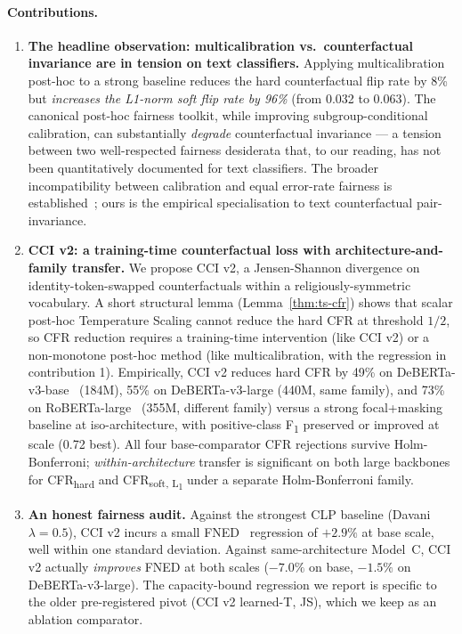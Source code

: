 \documentclass[10pt,a4paper]{article}
\begin{document}
\paragraph{Contributions.}
\begin{enumerate}[leftmargin=*,itemsep=2pt]
    \item \textbf{The headline observation: multicalibration vs.\ counterfactual invariance are in tension on text classifiers.} Applying multicalibration~\citep{hebertjohnson2018multicalibration} post-hoc to a strong baseline reduces the hard counterfactual flip rate by 8\% but \emph{increases the L1-norm soft flip rate by 96\%} (from 0.032 to 0.063). The canonical post-hoc fairness toolkit, while improving subgroup-conditional calibration, can substantially \emph{degrade} counterfactual invariance --- a tension between two well-respected fairness desiderata that, to our reading, has not been quantitatively documented for text classifiers. The broader incompatibility between calibration and equal error-rate fairness is established~\citep{pleiss2017fairness}; ours is the empirical specialisation to text counterfactual pair-invariance.
    \item \textbf{CCI v2: a training-time counterfactual loss with architecture-and-family transfer.} We propose CCI v2, a Jensen-Shannon divergence on identity-token-swapped counterfactuals within a religiously-symmetric vocabulary. A short structural lemma (Lemma~\ref{thm:ts-cfr}) shows that scalar post-hoc Temperature Scaling cannot reduce the hard CFR at threshold $1/2$, so CFR reduction requires a training-time intervention (like CCI v2) or a non-monotone post-hoc method (like multicalibration, with the regression in contribution 1). Empirically, CCI v2 reduces hard CFR by 49\% on DeBERTa-v3-base~\citep{he2023debertav3} (184M), 55\% on DeBERTa-v3-large (440M, same family), and 73\% on RoBERTa-large~\citep{liu2019roberta} (355M, different family) versus a strong focal+masking baseline at iso-architecture, with positive-class F\textsubscript{1} preserved or improved at scale (0.72 best). All four base-comparator CFR rejections survive Holm-Bonferroni; \emph{within-architecture} transfer is significant on both large backbones for CFR\textsubscript{hard} and CFR\textsubscript{soft, L\textsubscript{1}} under a separate Holm-Bonferroni family.
    \item \textbf{An honest fairness audit.} Against the strongest CLP baseline (Davani $\lambda=0.5$), CCI v2 incurs a small FNED~\citep{dixon2018measuring} regression of $+2.9\%$ at base scale, well within one standard deviation. Against same-architecture Model~C, CCI v2 actually \emph{improves} FNED at both scales ($-7.0\%$ on base, $-1.5\%$ on DeBERTa-v3-large). The capacity-bound regression we report is specific to the older pre-registered pivot (CCI v2 learned-T, JS), which we keep as an ablation comparator.

\end{enumerate}
\end{document}
